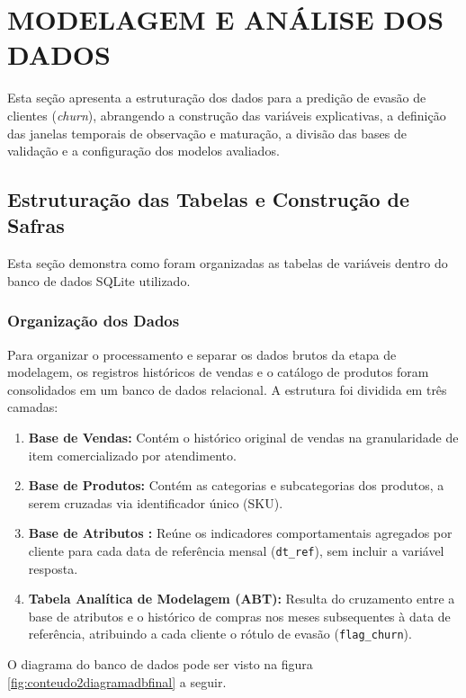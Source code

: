 \section{MODELAGEM E ANÁLISE DOS DADOS}\label{sec:conteudo3}

Esta seção apresenta a estruturação dos dados para a predição de evasão de clientes (\textit{churn}), abrangendo a construção das variáveis explicativas, a definição das janelas temporais de observação e maturação, a divisão das bases de validação e a configuração dos modelos avaliados.

\subsection{Estruturação das Tabelas e Construção de Safras}\label{subsec:arquitetura_sql}

Esta seção demonstra como foram organizadas as tabelas de variáveis dentro do banco de dados SQLite utilizado.

\subsubsection{Organização dos Dados}
Para organizar o processamento e separar os dados brutos da etapa de modelagem, os registros históricos de vendas e o catálogo de produtos foram consolidados em um banco de dados relacional. A estrutura foi dividida em três camadas:
\begin{enumerate}[leftmargin=*]
    \item \textbf{Base de Vendas:} Contém o histórico original de vendas na granularidade de item comercializado por atendimento.
    \item \textbf{Base de Produtos:} Contém as categorias e subcategorias dos produtos, a serem cruzadas via identificador único (SKU).
    \item \textbf{Base de Atributos :} Reúne os indicadores comportamentais agregados por cliente para cada data de referência mensal (\texttt{dt\_ref}), sem incluir a variável resposta.
    \item \textbf{Tabela Analítica de Modelagem (ABT):} Resulta do cruzamento entre a base de atributos e o histórico de compras nos meses subsequentes à data de referência, atribuindo a cada cliente o rótulo de evasão (\texttt{flag\_churn}).
\end{enumerate}

O diagrama do banco de dados pode ser visto na figura \ref{fig:conteudo2diagramadbfinal} a seguir.

